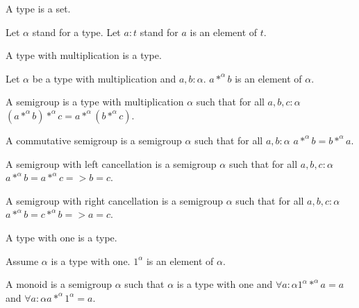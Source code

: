 \documentclass[english]{article}
\begin{document}
\begin{forthel}

\begin{signature}
A type is a set.
\end{signature}

Let $\alpha$ stand for a type.
Let $a : t$ stand for $a$ is an element of $t$.

\begin{signature}
A type with multiplication is a type.
\end{signature}

\begin{signature}
Let $\alpha$ be a type with multiplication and $a,b : \alpha$.
$a *^{\alpha} b$ is an element of $\alpha$.
\end{signature}

\begin{definition}
A semigroup is a type with multiplication $\alpha$
such that for all $a,b,c : \alpha$
$(a *^{\alpha} b) *^{\alpha} c = a *^{\alpha} (b *^{\alpha} c)$.
\end{definition}

\begin{definition}
A commutative semigroup is a semigroup $\alpha$
such that for all $a,b : \alpha$
$a *^{\alpha} b = b *^{\alpha} a$.
\end{definition}

\begin{definition}
A semigroup with left cancellation is a semigroup
$\alpha$ such that for all $a,b,c : \alpha$
$a *^{\alpha} b = a *^{\alpha} c => b = c$.
\end{definition}

\begin{definition}
A semigroup with right cancellation is a semigroup
$\alpha$ such that for all $a,b,c : \alpha$
$a *^{\alpha} b = c *^{\alpha} b => a = c$.
\end{definition}

\begin{signature}
A type with one is a type.
\end{signature}

\begin{signature}
Assume $\alpha$ is a type with one. $1^{\alpha}$ is an
element of $\alpha$.
\end{signature}

\begin{definition}
A monoid is a semigroup $\alpha$ such that $\alpha$ is a type
with one and
$\forall a : \alpha 1^{\alpha} *^{\alpha} a = a$ and
$\forall a : \alpha a *^{\alpha} 1^{\alpha} = a$.
\end{definition}


\end{forthel}
\end{document}

